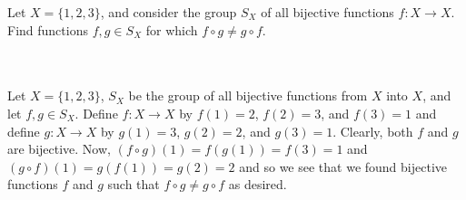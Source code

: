 Let $X=\{1, 2, 3\}$, and consider the group $S_X$ of all bijective functions $f:X\rightarrow X$. Find
functions $f,g\in S_X$ for which $f\circ g\neq g\circ f$.\\\\

\begin{solution}\renewcommand{\qedsymbol}{}\ \\
    Let $X=\{1,2,3\}$, $S_X$ be the group of all bijective functions from $X$ into $X$, and let
    $f,g\in S_X$. Define $f:X\rightarrow X$ by $f(1)=2$, $f(2)=3$, and $f(3)=1$ and define
    $g:X\rightarrow X$ by $g(1)=3$, $g(2)=2$, and $g(3)=1$. Clearly, both $f$ and $g$ are bijective.
    Now, $(f\circ g)(1)=f(g(1))=f(3)=1$ and $(g\circ f)(1)=g(f(1))=g(2)=2$ and so we see that we found
    bijective functions $f$ and $g$ such that $f\circ g\neq g\circ f$ as desired.

\end{solution}
